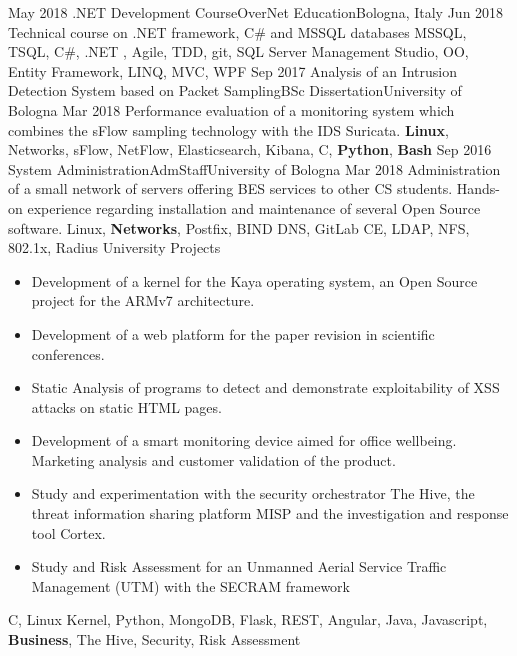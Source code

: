 \begin{experiences}
  \experience
  {May 2018}   {.NET Development Course}{OverNet Education}{Bologna, Italy}
  {Jun 2018} {
                    Technical course on .NET framework, C\# and MSSQL databases
                  }
                  {MSSQL, TSQL, C\#, .NET , Agile, TDD, git, SQL Server Management Studio, OO, Entity Framework, LINQ, MVC, WPF}
\emptySeparator
  \experience
    {Sep 2017}   {Analysis of an Intrusion Detection System based on Packet Sampling}{BSc Dissertation}{University of Bologna}
    {Mar 2018} {
                      Performance evaluation of a monitoring system which combines the sFlow sampling technology with the IDS Suricata.
                    }
                    {\textbf{Linux}, Networks, sFlow, NetFlow, Elasticsearch, Kibana, C, \textbf{Python}, \textbf{Bash}}
  \emptySeparator
  \experience
    {Sep 2016}   {System Administration}{AdmStaff}{University of Bologna}
    {Mar 2018} {
                      Administration of a small network of servers offering BES services to other CS students. \linebreak
                      Hands-on experience regarding installation and maintenance of several Open Source software.
                    }
                    {Linux, \textbf{Networks}, Postfix, BIND DNS, GitLab CE, LDAP, NFS, 802.1x, Radius}
  \emptySeparator
  \experience
    {}   {University Projects}{}{}
    {} {
                  \begin{itemize}
                    \item Development of a kernel for the Kaya operating system, an Open Source project for the ARMv7 architecture.
                    \item Development of a web platform for the paper revision in scientific conferences.
                    \item Static Analysis of programs to detect and demonstrate exploitability of XSS attacks on static HTML pages.
                    \item Development of a smart monitoring device aimed for office wellbeing. Marketing analysis and customer validation of the product.
                    \item Study and experimentation with the security orchestrator The Hive, the threat information sharing platform MISP and the investigation and response tool Cortex.
                    \item Study and Risk Assessment for an Unmanned Aerial Service Traffic Management (UTM) with the SECRAM framework
                  \end{itemize}
                }
                  {C, Linux Kernel, Python, MongoDB, Flask, REST, Angular, Java, Javascript, \textbf{Business}, The Hive, Security, Risk Assessment }
  \emptySeparator
\end{experiences}
